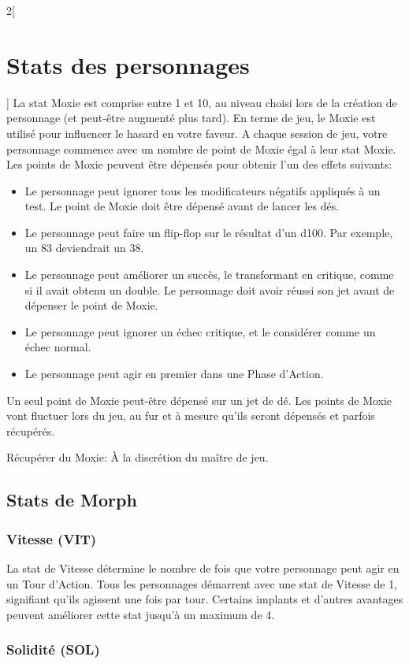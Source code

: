 \documentclass[a4paper,9pt]{article}
\begin{document}
\begin{multicols}{2}[\section{Stats des personnages} \label{sec:character-stats}]
La stat Moxie est comprise entre 1 et 10, au niveau choisi lors de la création
de personnage (et peut-être augmenté plus tard). En terme de jeu, le Moxie est
utilisé pour influencer le hasard en votre faveur. A chaque session de jeu,
votre personnage commence avec un nombre de point de Moxie égal à leur stat
Moxie. Les points de Moxie peuvent être dépensés pour obtenir l'un des effets
suivants: 

\begin{itemize}
   \item Le personnage peut ignorer tous les modificateurs négatifs appliqués à
   un test. Le point de Moxie doit être dépensé avant de lancer les dés.
   \item Le personnage peut faire un flip-flop sur le résultat d'un d100. Par
   exemple, un 83 deviendrait un 38.
   \item Le personnage peut améliorer un succès, le transformant en critique,
   comme si il avait obtenu un double. Le personnage doit avoir réussi son jet
   avant de dépenser le point de Moxie.
   \item Le personnage peut ignorer un échec critique, et le considérer comme
   un échec normal.
   \item Le personnage peut agir en premier dans une Phase d'Action.
\end{itemize} 

Un seul point de Moxie peut-être dépensé sur un jet de dé. Les points de Moxie
vont fluctuer lors du jeu, au fur et à mesure qu'ils seront dépensés et parfois
récupérés. 

Récupérer du Moxie: À la discrétion du maître de jeu. 

\subsection{Stats de Morph}

\subsubsection{Vitesse (VIT)} \label{sec:speed-spd} 

La stat de Vitesse détermine le nombre de fois que votre personnage peut agir
en un Tour d'Action. Tous les personnages démarrent avec une stat de Vitesse de
1, signifiant qu'ils agissent une fois par tour.  Certains implants et d'autres
avantages peuvent améliorer cette stat jusqu'à un maximum de 4. 

\subsubsection{Solidité (SOL)} \label{sec:durability-dur} 


\end{multicols}
\end{document}
